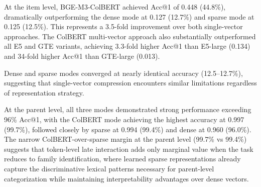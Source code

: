 \documentclass[preprint,12pt]{elsarticle}
\begin{document}
\begin{table}[htbp]
\centering
\caption{Performance comparison of BGE-M3 retrieval modes. All modes use the same base encoder (568M parameters) with mode-specific output layers.}
\label{tab:bgem3_performance}
\end{table}

At the item level, BGE-M3-ColBERT achieved Acc@1 of 0.448 (44.8\%), dramatically outperforming the dense mode at 0.127 (12.7\%) and sparse mode at 0.125 (12.5\%). This represents a 3.5-fold improvement over both single-vector approaches. The ColBERT multi-vector approach also substantially outperformed all E5 and GTE variants, achieving 3.3-fold higher Acc@1 than E5-large (0.134) and 34-fold higher Acc@1 than GTE-large (0.013).

Dense and sparse modes converged at nearly identical accuracy (12.5--12.7\%), suggesting that single-vector compression encounters similar limitations regardless of representation strategy.

At the parent level, all three modes demonstrated strong performance exceeding 96\% Acc@1, with the ColBERT mode achieving the highest accuracy at 0.997 (99.7\%), followed closely by sparse at 0.994 (99.4\%) and dense at 0.960 (96.0\%). The narrow ColBERT-over-sparse margin at the parent level (99.7\% vs 99.4\%) suggests that token-level late interaction adds only marginal value when the task reduces to family identification, where learned sparse representations already capture the discriminative lexical patterns necessary for parent-level categorization while maintaining interpretability advantages over dense vectors.
\end{document}
